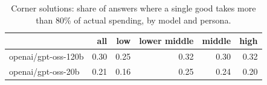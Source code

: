 \begin{table}[!htbp]\centering\small
\caption{Corner solutions: share of answers where a single good takes more than 80\% of actual spending, by model and persona.}\label{tab:corner_share}
\begin{tabular}{lrrrrr}
\hline
 & all & low & lower middle & middle & high \\ \hline
openai/gpt-oss-120b & 0.30 & 0.25 & 0.32 & 0.30 & 0.32 \\
openai/gpt-oss-20b & 0.21 & 0.16 & 0.25 & 0.24 & 0.20 \\
\hline
\end{tabular}
\end{table}